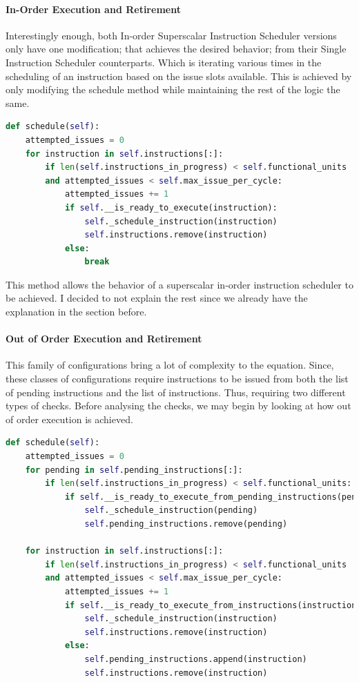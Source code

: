 \documentclass{article}
\begin{document}
\paragraph{In-Order Execution and Retirement}
Interestingly enough, both In-order Superscalar Instruction Scheduler versions only have one modification; that achieves the desired behavior; from their Single Instruction Scheduler counterparts. Which is iterating various times in the scheduling of an instruction based on the issue slots available. This is achieved by only modifying the schedule method while maintaining the rest of the logic the same. 

\begin{lstlisting}[language=Python]
def schedule(self):
    attempted_issues = 0
    for instruction in self.instructions[:]:
        if len(self.instructions_in_progress) < self.functional_units 
        and attempted_issues < self.max_issue_per_cycle:
            attempted_issues += 1
            if self.__is_ready_to_execute(instruction):
                self._schedule_instruction(instruction)
                self.instructions.remove(instruction)
            else:
                break
\end{lstlisting}

This method allows the behavior of a superscalar in-order instruction scheduler to be achieved. I decided to not explain the rest since we already have the explanation in the section before.

\paragraph{Out of Order Execution and Retirement}
This family of configurations bring a lot of complexity to the equation. Since, these classes of configurations require instructions to be issued from both the list of pending instructions and the list of instructions. Thus, requiring two different types of checks. Before analysing the checks, we may begin by looking at how out of order execution is achieved.

\begin{lstlisting}[language=Python]
def schedule(self):
    attempted_issues = 0
    for pending in self.pending_instructions[:]:
        if len(self.instructions_in_progress) < self.functional_units:
            if self.__is_ready_to_execute_from_pending_instructions(pending):
                self._schedule_instruction(pending)
                self.pending_instructions.remove(pending)

    for instruction in self.instructions[:]:
        if len(self.instructions_in_progress) < self.functional_units 
        and attempted_issues < self.max_issue_per_cycle:
            attempted_issues += 1
            if self.__is_ready_to_execute_from_instructions(instruction):
                self._schedule_instruction(instruction)
                self.instructions.remove(instruction)
            else:
                self.pending_instructions.append(instruction)
                self.instructions.remove(instruction)
\end{lstlisting}
\end{document}

